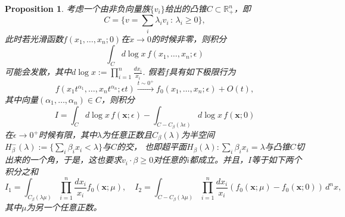 \documentclass[11pt]{article}
\theoremstyle{definition}
\theoremstyle{plain}
\newtheorem{pro}[para]{Proposition}
\begin{document}
\begin{pro}
考虑一个由非负向量族$\{v_i\}$给出的凸锥$C\subset \mathbb R_+^n$，即
\[
	C=\{v=\sum_{i}\lambda_iv_i\,:\,\lambda_i\geq 0\},
\]
此时若光滑函数$f(x_1,\dots,x_n;0)$在$x\to 0$的时候非零，则积分
\[
	\int_C d\log x\,f(x_1,\dots,x_n;\epsilon)
\]
可能会发散，其中$d\log x:=\prod_{i=1}^n\frac{dx_i}{x_i}$. 假若$f$具有如下极限行为
\[
f(x_1t^{\alpha_1},\dots,x_nt^{\alpha_n};\epsilon t)\xrightarrow{t\sim 0^+}f_0(x_1,\dots,x_n;\epsilon)+O(t),
\]
其中向量$(\alpha_1,\dots,\alpha_n)\in C$，则积分
\[
I=\int_{C} d\log x\,f(\mathbf{x};\epsilon)-\int_{C-C_\beta(\lambda\epsilon)} d\log x\,f(\mathbf{x};0)
\]
在$\epsilon\to 0^+$时候有限，其中$\lambda$为任意正数且$C_\beta(\lambda)$为半空间$H_\beta^-(\lambda):=\{\sum_i\beta_ix_i<\lambda\}$与$C$的交，
也即超平面$H_\beta(\lambda):\sum_i\beta_ix_i=\lambda$与凸锥$C$切出来的一个角，于是，这也要求$v_i\cdot \beta\geq 0$对任意的$i$都成立。并且，$I$等于如下两个积分之和
\[
	I_1=\int_{C_\beta(\lambda\mu)}\prod_{i=1}^n \frac{dx_i}{x_i} f_0(\mathbf{x};\mu),\quad I_2=\int_{C-C_\beta(\lambda\mu)}\prod_{i=1}^n \frac{dx_i}{x_i} (f_0(\mathbf x;\mu)-f_0(\mathbf x;0))\,d^nx,
\]
其中$\mu$为另一个任意正数。
\end{pro}

\end{document}

